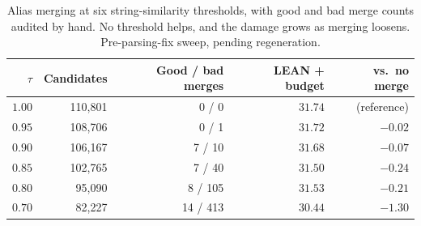 \documentclass{article}
\begin{document}
\begin{table}
  \caption{Alias merging at six string-similarity thresholds, with good and bad merge counts audited by hand. No threshold helps, and the damage grows as merging loosens. Pre-parsing-fix sweep, pending regeneration.}
  \label{tab:alias}
  \centering
  \begin{tabular}{rrrrr}
    \toprule
    $\tau$ & Candidates & Good / bad merges & LEAN + budget & vs.\ no merge \\
    \midrule
    $1.00$ & 110,801 & 0 / 0     & $31.74$ & (reference) \\
    $0.95$ & 108,706 & 0 / 1     & $31.72$ & $-0.02$ \\
    $0.90$ & 106,167 & 7 / 10    & $31.68$ & $-0.07$ \\
    $0.85$ & 102,765 & 7 / 40    & $31.50$ & $-0.24$ \\
    $0.80$ &  95,090 & 8 / 105   & $31.53$ & $-0.21$ \\
    $0.70$ &  82,227 & 14 / 413  & $30.44$ & $-1.30$ \\
    \bottomrule
  \end{tabular}
\end{table}
\end{document}
